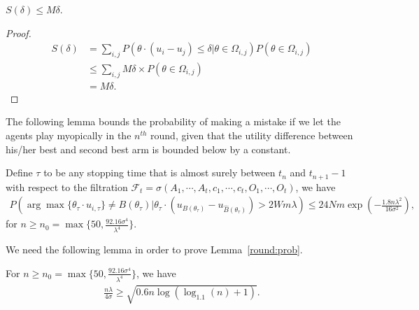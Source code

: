 \documentclass[twoside,11pt]{article}
\begin{document}
\begin{lemma}
$S(\delta)\leq M\delta$.
\label{lemma:sdelta}
\end{lemma}

\begin{proof}
\begin{align*}
S(\delta)
&=\sum_{i,j}P(\theta\cdot(u_{i}-u_{j})\le \delta|\theta\in \Omega_{i,j})P(\theta\in \Omega_{i,j}) \\
&\leq \sum_{i,j}M\delta \times P(\theta\in \Omega_{i,j}) \\
&=M\delta.
\end{align*}
\end{proof}

The following lemma bounds the probability of making a mistake if we let the agents play myopically in the $n^{th}$ round, given that the utility difference between his/her best and second best arm is bounded below by a constant. 

\begin{lemma}
Define $\tau$ to be any stopping time that is almost surely between $t_n$ and $t_{n+1}-1$ with respect to the filtration $\mathcal{F}_{t}=\sigma(A_1,\cdots,A_t,c_1,\cdots,c_t,O_1,\cdots,O_t)$, we have 
\begin{align}
P(\arg\max\{\theta_{\tau}\cdot u_{i,\tau}\}\neq B(\theta_{\tau})|\theta_{\tau}\cdot(u_{B(\theta_{\tau})}-u_{\hat{B}(\theta_{\tau})})> 2Wm\lambda)\leq 24Nm\exp\left(-\frac{1.8n\lambda^2}{16\sigma^2}\right), \nonumber
\end{align}
for $n\geq n_{0}=\max\{50, \frac{92.16\sigma^4}{\lambda^4}\}$.
\label{round:prob}
\end{lemma}


We need the following lemma in order to prove Lemma~\ref{round:prob}.

\begin{lemma}
For $n\geq n_{0}=\max\{50, \frac{92.16\sigma^4}{\lambda^4}\}$, we have
\begin{align}
\frac{n\lambda}{4\sigma}\geq \sqrt{0.6n\log(\log_{1.1}(n)+1)}. \nonumber
\end{align}
\label{n0-inequality}
\end{lemma}
\end{document}
